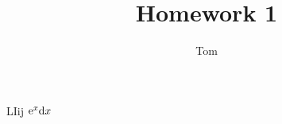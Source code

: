 \documentclass{myhomework}
\author{Tom}
\title{Homework 1}
\begin{document}
    LIij
    $\mathrm e^x\mathrm d x$
\end{document}
